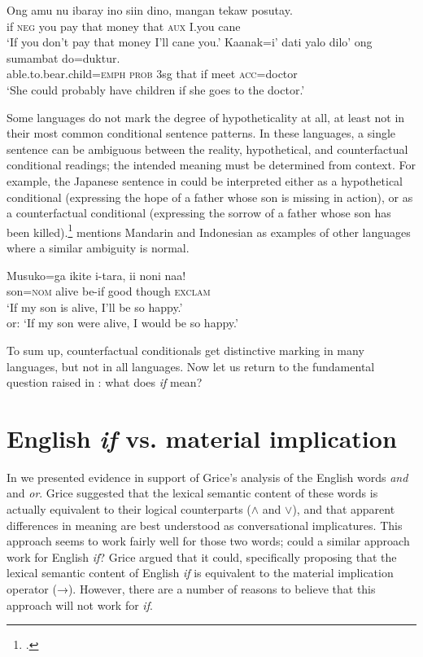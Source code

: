 \ea \label{ex:19.19}
\ea  \gll  Ong  amu  nu  ibaray  ino  siin  dino,  mangan  tekaw  posutay.\\
if  \textsc{neg}  you  pay  that  money  that  \textsc{aux}  I.you  cane\\
\glt ‘If you don’t pay that money I’ll cane you.’
\ex \gll  Kaanak=i’  dati  yalo  dilo’  ong  sumambat  do=duktur.\\
able.to.bear.child=\textsc{emph}  \textsc{prob}  3sg  that  if  meet  \textsc{acc}=doctor\\
\glt ‘She could probably have children if she goes to the doctor.’
\z \z


Some languages do not mark the degree of hypotheticality at all, at least not in their most common conditional sentence patterns. In these languages, a single sentence can be ambiguous between the reality, hypothetical, and counterfactual conditional readings; the intended meaning must be determined from context. For example, the Japanese sentence in  could be interpreted either as a hypothetical conditional (expressing the hope of a father whose son is missing in action), or as a counterfactual conditional (expressing the sorrow of a father whose son has been killed).\footnote{\citet[627]{Akatsuka1985}.} \citet{Comrie1986} mentions Mandarin and Indonesian as examples of other languages where a similar ambiguity is normal.


\ea \label{ex:19.20}
\gll Musuko=ga  ikite  i-tara,  ii  noni  naa!\\
son=\textsc{nom}  alive  be-if  good  though  \textsc{exclam}\\
\glt ‘If my son is alive, I’ll be so happy.’\\
or: ‘If my son were alive, I would be so happy.’
\z


To sum up, counterfactual conditionals get distinctive marking in many languages, but not in all languages. Now let us return to the fundamental question raised in : what does \textit{if} mean?


\section{English \textit{if} vs. material implication}\label{sec:19.4}

In  we presented evidence in support of Grice’s analysis of the English words \textit{and} and \textit{or}. Grice suggested that the lexical semantic content of these words is actually equivalent to their logical counterparts ($\wedge$ and $\vee$), and that apparent differences in meaning are best understood as conversational implicatures. This approach seems to work fairly well for those two words; could a similar approach work for English \textit{if}? Grice argued that it could, specifically proposing that the lexical semantic content of English \textit{if} is equivalent to the material implication operator (→). However, there are a number of reasons to believe that this approach will not work for \textit{if}.



